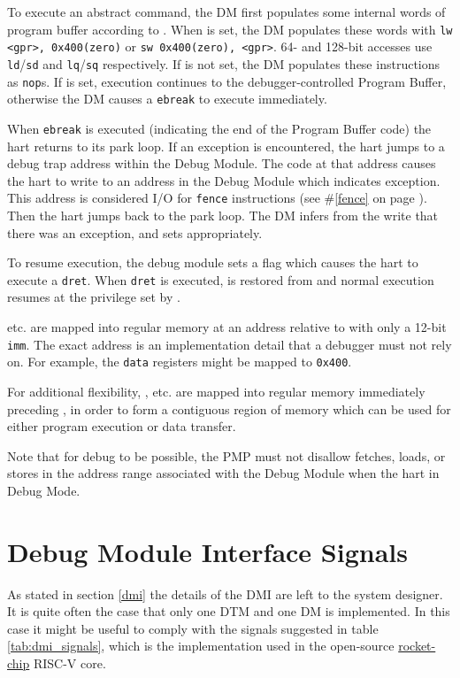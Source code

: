 To execute an abstract command, the DM first populates some internal words of
program buffer according to \RdmCommand. When \FacAccessregisterTransfer is set, the DM
populates these words with {\tt lw <gpr>, 0x400(zero)} or {\tt sw 0x400(zero), <gpr>}.
64- and 128-bit accesses use {\tt ld}/{\tt sd} and {\tt lq}/{\tt sq}
respectively. If \FacAccessregisterTransfer is not set, the DM populates these instructions as {\tt nop}s.
If \FcsrMcontrolExecute is set, execution continues to the debugger-controlled Program Buffer,
otherwise the DM causes a {\tt ebreak} to execute immediately.

When {\tt ebreak} is executed (indicating the end of the
Program Buffer code) the hart returns to its park loop. If an exception is
encountered, the hart jumps to a debug trap address within
the Debug Module. The code at that address causes the hart to
write to an address in the Debug Module which indicates exception.
This address is considered I/O for {\tt fence} instructions (see \#\ref{fence}
on page \pageref{fence}).
Then the hart jumps back to the park loop.
The DM infers from the write that there was an exception, and sets \FdmAbstractcsCmderr appropriately.

To resume execution, the debug module sets a flag which causes the hart to execute a {\tt dret}.
When {\tt dret} is executed, \Rpc is restored from \RcsrDpc and normal execution resumes at the
privilege set by \FcsrDcsrPrv.

\RdmDataZero etc. are mapped into regular memory at an address relative to \Rzero
with only a 12-bit {\tt imm}. The exact address is an implementation
detail that a debugger must not rely on. For example, the {\tt data}
registers might be mapped to {\tt 0x400}.

For additional flexibility, \RdmProgbufZero, etc. are mapped into regular memory
immediately preceding \RdmDataZero, in order to form a contiguous region of memory which
can be used for either program execution or data transfer.

Note that for debug to be possible, the PMP must not disallow fetches, loads, or stores
in the address range associated with the Debug Module when the hart in Debug Mode.

\section{Debug Module Interface Signals} \label{dmi_signals}

As stated in section \ref{dmi} the details of the DMI are left to the system designer.
It is quite often the case that only one DTM and one DM is implemented.
In this case it might be useful to comply with the signals suggested in table \ref{tab:dmi_signals},
which is the implementation used in the open-source \href{https://github.com/chipsalliance/rocket-chip/blob/375045a7db1bdc7b4f7851f1a59b3f10a2b922ff/src/main/scala/devices/debug/Debug.scala#L170}{rocket-chip} RISC-V core.

